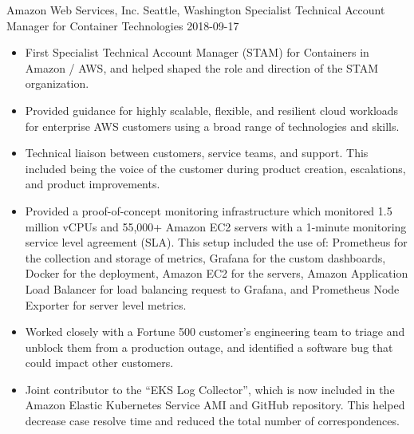 \roleheader
    {Amazon Web Services, Inc.}
    {Seattle, Washington}
    {Specialist Technical Account Manager for Container Technologies}
    {2018-09-17}
    {}

\begin{itemize} \itemsep 0pt
    \item First Specialist Technical Account Manager (STAM) for Containers in Amazon / AWS, and helped shaped the role and direction of the STAM organization.
    \item Provided guidance for highly scalable, flexible, and resilient cloud workloads for enterprise AWS customers using a broad range of technologies and skills.
    \item Technical liaison between customers, service teams, and support. This included being the voice of the customer during product creation, escalations, and product improvements.
    \item Provided a proof-of-concept monitoring infrastructure which monitored 1.5 million vCPUs and 55,000+ Amazon EC2 servers with a 1-minute monitoring service level agreement (SLA). This setup included the use of: Prometheus for the collection and storage of metrics, Grafana for the custom dashboards, Docker for the deployment, Amazon EC2 for the servers, Amazon Application Load Balancer for load balancing request to Grafana, and Prometheus Node Exporter for server level metrics.
    \item Worked closely with a Fortune 500 customer's engineering team to triage and unblock them from a production outage, and identified a software bug that could impact other customers.
    \item Joint contributor to the ``EKS Log Collector'', which is now included in the Amazon Elastic Kubernetes Service AMI and GitHub repository. This helped decrease case resolve time and reduced the total number of correspondences.
\end{itemize}